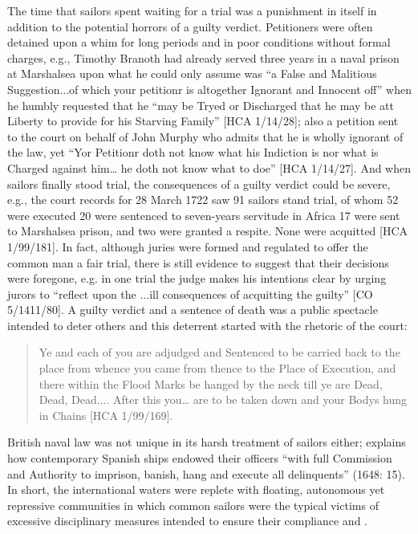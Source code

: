 The time that sailors spent waiting for a trial was a punishment in itself in addition to the potential horrors of a guilty verdict. Petitioners were often detained upon a whim for long periods and in poor conditions without formal charges, e.g., Timothy Branoth had already served three years in a naval prison at Marshalsea upon what he could only assume was “a False and Malitious Suggestion...of which your petitionr is altogether Ignorant and Innocent off” when he humbly requested that he “may be Tryed or Discharged that he may be att Liberty to provide for his Starving Family” [HCA 1/14/28]; also a petition sent to the court on behalf of John Murphy who admits that he is wholly ignorant of the law, yet “Yor Petitionr doth not know what his Indiction is nor what is Charged against him… he doth not know what to doe” [HCA 1/14/27]. And when sailors finally stood trial, the consequences of a guilty verdict could be severe, e.g., the court records for 28 {March 1722} saw 91 sailors stand trial, of whom 52 were executed 20 were sentenced to seven-years servitude in Africa 17 were sent to Marshalsea prison, and two were granted a respite. None were acquitted [HCA 1/99/181]. In fact, although juries were formed and regulated to offer the common man a fair trial, there is still evidence to suggest that their decisions were foregone, e.g. in one trial the judge makes his intentions clear by urging jurors to “reflect upon the ...ill consequences of acquitting the guilty” [CO 5/1411/80]. A guilty verdict and a sentence of death was a public spectacle intended to deter others and this deterrent started with the rhetoric of the court: 

\begin{quotation}
Ye and each of you are adjudged and Sentenced to be carried back to the place from whence you came from thence to the Place of Execution, and there within the Flood Marks be hanged by the neck till ye are Dead, Dead, Dead.... After this you… are to be taken down and your Bodys hung in Chains [HCA 1/99/169]. 
\end{quotation}

British naval law was not unique in its harsh treatment of sailors either; \citeauthor{Gage1648} explains how contemporary Spanish ships endowed their officers “with full Commission and Authority to imprison, banish, hang and execute all delinquents” (1648: 15). In short, the international waters were replete with floating, autonomous yet repressive communities in which common sailors were the typical victims of excessive disciplinary measures intended to ensure their compliance and . 


